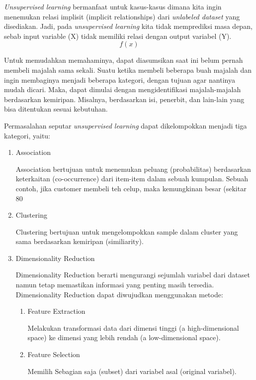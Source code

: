 \textit{Unsupervised learning} bermanfaat untuk kasus-kasus dimana kita ingin menemukan relasi implisit (implicit relationships) dari \textit{unlabeled dataset} yang disediakan. Jadi, pada \textit{unsupervised learning} kita tidak memprediksi masa depan, sebab input variable (X) tidak memiliki relasi dengan output variabel (Y). 
\[ f(x) \]

Untuk memudahkan memahaminya, dapat diasumsikan saat ini belum pernah membeli majalah sama sekali. Suatu ketika membeli beberapa buah majalah dan ingin membaginya menjadi beberapa kategori, dengan tujuan agar nantinya mudah dicari. Maka, dapat dimulai dengan mengidentifikasi majalah-majalah berdasarkan kemiripan. Misalnya, berdasarkan isi, penerbit, dan lain-lain yang bisa ditentukan sesuai kebutuhan.

Permasalahan seputar \textit{unsupervised learning} dapat dikelompokkan menjadi tiga kategori, yaitu:

\begin{enumerate}
	\item Association
	
	Association bertujuan untuk menemukan peluang (probabilitas) berdasarkan keterkaitan (co-occurrence) dari item-item dalam sebuah kumpulan. Sebuah contoh, jika customer membeli teh celup, maka kemungkinan besar (sekitar 80%
	\item Clustering
	
	Clustering bertujuan untuk mengelompokkan sample dalam cluster yang sama berdasarkan kemiripan (similiarity).
	
	\item Dimensionality Reduction
	
	Dimensionality Reduction berarti mengurangi sejumlah variabel dari dataset namun tetap memastikan informasi yang penting masih tersedia. Dimensionality Reduction dapat diwujudkan menggunakan metode:
	\begin{enumerate}[label=(\alph*)]
		\item Feature Extraction
		
		Melakukan transformasi data dari dimensi tinggi (a high-dimensional space) ke dimensi yang lebih rendah (a low-dimensional space).
		
		\item Feature Selection
		
		Memilih Sebagian saja (subset) dari variabel asal (original variabel). 
	\end{enumerate}
\end{enumerate}

